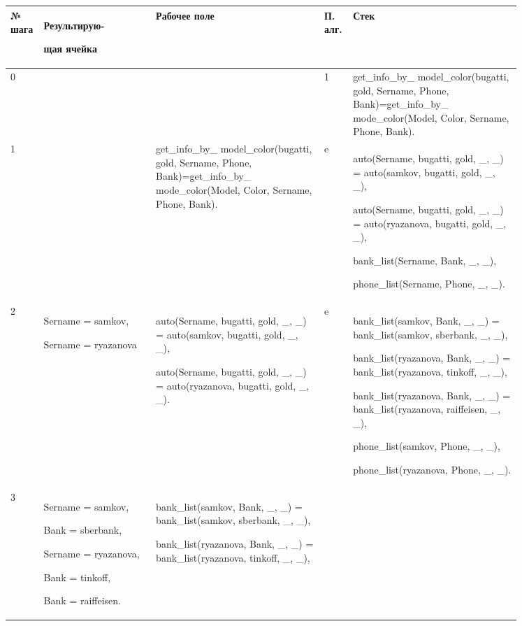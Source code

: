 \documentclass[a4paper,12pt]{article}
\begin{document}
	\begin{center}
		\begin{longtable}[h!]{|p{0.025\linewidth}|p{0.2\linewidth}|p{ 0.3\linewidth}|p{ 0.025\linewidth}|p{ 0.3\linewidth}|}
			\hline
			{\bf  № шага} & {\bf Результирую-
				
				щая ячейка} & {\bf Рабочее поле} & {\bf П. алг.} & {\bf Стек}\\
			\hline
			{0} & {} & {} & {1} & {get\_info\_by\_
				model\_color(bugatti, gold, Sername, Phone, Bank)=get\_info\_by\_
				mode\_color(Model, Color, Sername, Phone, Bank).}\\
			\hline
			{1} & {} & {get\_info\_by\_
				model\_color(bugatti, gold, Sername, Phone, Bank)=get\_info\_by\_
				mode\_color(Model, Color, Sername, Phone, Bank).} & {e} & {auto(Sername, bugatti, gold, \_, \_) = auto(samkov, bugatti, gold, \_, \_),
				
				auto(Sername, bugatti, gold, \_, \_) = auto(ryazanova, bugatti, gold, \_, \_),
				
				bank\_list(Sername, Bank, \_, \_),
				
				phone\_list(Sername, Phone, \_, \_).}\\
			\hline
			{2} & {Sername = samkov,
				
				Sername = ryazanova} & {auto(Sername, bugatti, gold, \_, \_) = auto(samkov, bugatti, gold, \_, \_),
				
				auto(Sername, bugatti, gold, \_, \_) = auto(ryazanova, bugatti, gold, \_, \_).} & {e} & {bank\_list(samkov, Bank, \_, \_) = bank\_list(samkov, sberbank, \_, \_),
				
				bank\_list(ryazanova, Bank, \_, \_) = bank\_list(ryazanova, tinkoff, \_, \_),
				
				bank\_list(ryazanova, Bank, \_, \_) = bank\_list(ryazanova, raiffeisen, \_, \_),
				
				phone\_list(samkov, Phone, \_, \_),
				
				phone\_list(ryazanova, Phone, \_, \_).}\\
			\hline
			{3} & {Sername = samkov,
				
				Bank = sberbank,
				
				Sername = ryazanova,
				
				Bank = tinkoff,
				
				Bank = raiffeisen.} & {bank\_list(samkov, Bank, \_, \_) = bank\_list(samkov, sberbank, \_, \_),
				
				bank\_list(ryazanova, Bank, \_, \_) = bank\_list(ryazanova, tinkoff, \_, \_),
				
}
\end{longtable}
\end{center}
\end{document}
